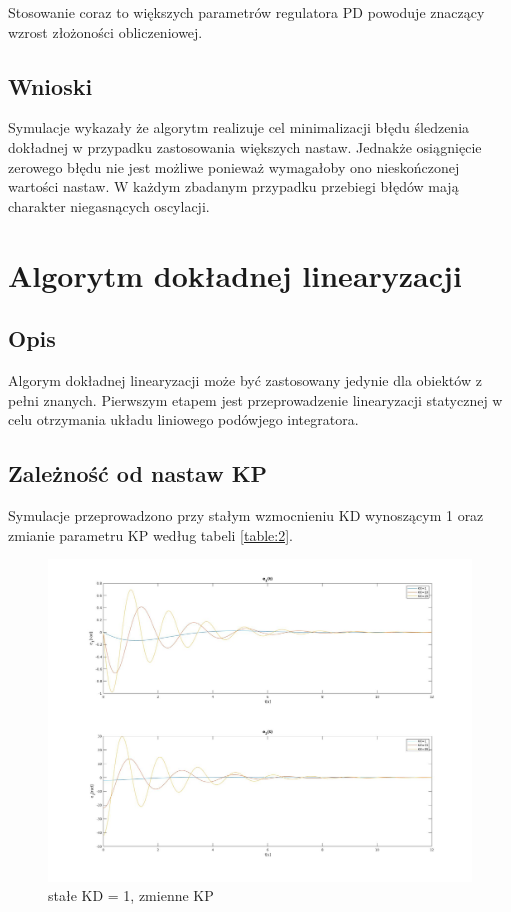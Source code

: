 \documentclass[12pt,a4paper]{article}
\begin{document}
    Stosowanie coraz to większych parametrów regulatora PD powoduje znaczący wzrost złożoności obliczeniowej.

  \subsection{Wnioski}
    Symulacje wykazały że algorytm realizuje cel minimalizacji błędu śledzenia dokładnej w przypadku zastosowania większych nastaw. Jednakże osiągnięcie zerowego błędu nie jest możliwe ponieważ wymagałoby ono nieskończonej wartości nastaw. W każdym zbadanym przypadku przebiegi błędów mają charakter niegasnących oscylacji.


\section{Algorytm dokładnej linearyzacji}
  \subsection{Opis} %
    Algorym dokładnej linearyzacji może być zastosowany jedynie dla obiektów z pełni znanych. Pierwszym etapem jest przeprowadzenie linearyzacji statycznej w celu otrzymania układu liniowego podówjego integratora.
  \subsection{Zależność od nastaw KP}
    Symulacje przeprowadzono przy stałym wzmocnieniu KD wynoszącym 1 oraz zmianie parametru KP według tabeli \ref{table:2}.

    \begin{figure}[H]
      \centering
      \includegraphics[height=0.50\textheight]{figures/lin1.jpg}
      \caption{stałe KD = 1, zmienne KP}
      \label{fig:lin1}
    \end{figure}
\end{document}
